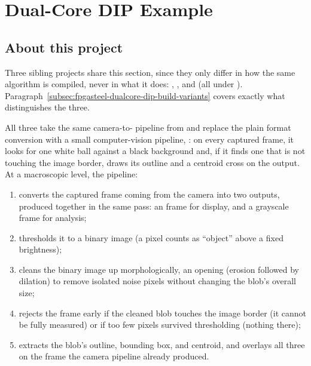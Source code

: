 \chapter{Dual-Core DIP Example}
\label{chap:fpgasteel-dualcore-dip}

\section{About this project}
\label{sec:fpgasteel-dualcore-dip-about}

Three sibling projects share this section, since they only differ in how the same algorithm is compiled, never in what it does: , , and  (all under ). Paragraph~\ref{subsec:fpgasteel-dualcore-dip-build-variants} covers exactly what distinguishes the three.

All three take the same camera-to- pipeline from  and replace the plain format conversion with a small computer-vision pipeline, : on every captured frame, it looks for one white ball against a black background and, if it finds one that is not touching the image border, draws its outline and a centroid cross on the  output. At a macroscopic level, the pipeline:

\begin{enumerate}
 \item converts the captured  frame coming from the camera into two outputs, produced together in the same pass: an  frame for  display, and a grayscale frame for analysis;
 \item thresholds it to a binary image (a pixel counts as ``object'' above a fixed brightness);
 \item cleans the binary image up morphologically, an opening (erosion followed by dilation) to remove isolated noise pixels without changing the blob's overall size;
 \item rejects the frame early if the cleaned blob touches the image border (it cannot be fully measured) or if too few pixels survived thresholding (nothing there);
 \item extracts the blob's outline, bounding box, and centroid, and overlays all three on the  frame the camera pipeline already produced.
\end{enumerate}


